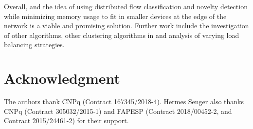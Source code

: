 Overall, \mfog and the idea of using distributed flow classification and novelty
detection while minimizing memory usage to fit in smaller devices at the edge of
the network is a viable and promising solution.
Further work include the investigation of other \nd algorithms, other clustering
algorithms in \minas and analysis of varying load balancing strategies.



\section*{Acknowledgment}

The authors thank CNPq (Contract 167345/2018-4).
Hermes Senger also thanks CNPq (Contract 305032/2015-1) and FAPESP (Contract
2018/00452-2, and Contract 2015/24461-2) for their support.
